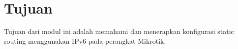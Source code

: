 \section*{Tujuan}

Tujuan dari modul ini adalah memahami dan menerapkan konfigurasi static routing menggunakan IPv6 pada perangkat Mikrotik.